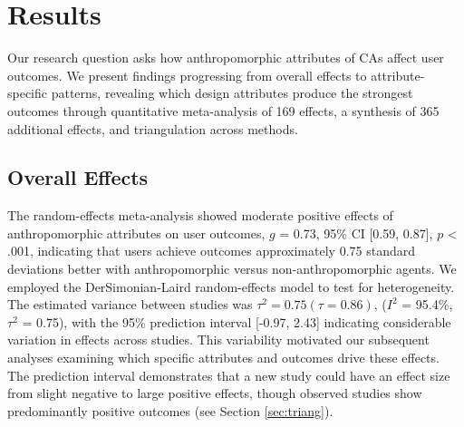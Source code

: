 \documentclass[sigconf,review,anonymous]{acmart}
\begin{document}
\section{Results}

Our research question asks how anthropomorphic attributes of CAs affect user outcomes. We present findings progressing from overall effects to attribute-specific patterns, revealing which design attributes produce the strongest outcomes through quantitative meta-analysis of 169 effects, a synthesis of 365 additional effects, and triangulation across methods.

\subsection{Overall Effects}
The random-effects meta-analysis showed moderate positive effects of anthropomorphic attributes on user outcomes, $g$ = 0.73, 95\% CI [0.59, 0.87], $p$ < .001, indicating that users achieve outcomes approximately 0.75 standard deviations better with anthropomorphic 
versus non-anthropomorphic agents.
We employed the DerSimonian-Laird random-effects model \citep{dersimonian1986meta} to test for heterogeneity. The estimated variance between studies was $\tau^2 = 0.75 (\tau = 0.86)$, ($I^2$ = 95.4\%, $\tau^2$ = 0.75), with the 95\% prediction interval [-0.97, 2.43] indicating considerable variation in effects across studies. This variability motivated our subsequent analyses examining which specific attributes and outcomes drive these 
effects. The prediction interval demonstrates that a new study could have an effect size from slight negative to large positive effects, though observed studies show predominantly positive outcomes (see Section \ref{sec:triang}). 
\end{document}
